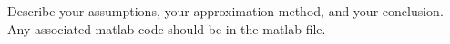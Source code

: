 \documentclass[12pt,letterpaper]{exam}
\begin{document}
\begin{questions}
Describe your assumptions, your approximation method, and your conclusion.  Any associated matlab code should be in the matlab file.





\end{questions}
\end{document}
